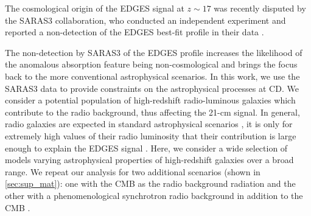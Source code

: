 The cosmological origin of the EDGES signal at $z \sim 17$ \cite{Bowman_edges_2018} was recently disputed by the SARAS3 collaboration, who conducted an independent experiment and reported a non-detection of the EDGES best-fit profile in their data \cite{SARAS3_spectrometer_2020, SARAS3_antenna_2021, SARAS_reciever_2021, SARAS3}. %

The non-detection by SARAS3 of the EDGES profile increases the likelihood of the anomalous absorption feature being non-cosmological and brings the focus back to the more conventional astrophysical scenarios. 
In this work, we use the SARAS3 data to provide constraints on the astrophysical processes at CD. We consider a potential population of high-redshift radio-luminous galaxies which contribute to the radio background, thus affecting the 21-cm signal. In general, radio galaxies are expected in standard astrophysical scenarios \cite{MirochaRB2019, Reis2020}, it is only for extremely high values of their radio luminosity that their contribution is large enough to explain the EDGES signal \cite{Bowman_edges_2018, FengRB2018, EwallRB2018, JanaRB2018, MirochaRB2019, Fialkov2019, Reis2020}. Here, we consider a wide selection of models varying astrophysical properties of high-redshift galaxies over a broad range. We repeat our analysis for two additional scenarios (shown in \cref{sec:sup_mat}): one with the CMB as the radio background radiation \cite{Reis_sta_2021} and the other with a phenomenological synchrotron radio background in addition to the CMB \cite{Fialkov2019}.

